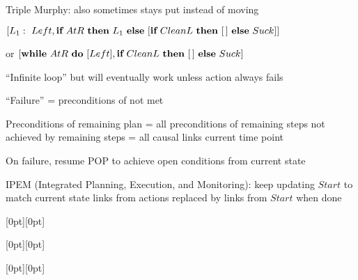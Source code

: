 \documentclass{article}
\newcommand{\condstep}[3]{\mbf{if}~#1~\mbf{then}~#2~\mbf{else}~#3}
\newcommand{\whilestep}[2]{\mbf{while}~#1~\mbf{do}~#2}
\newcommand{\noplan}{\emptylist}
\begin{document}
\begin{huge}
Triple Murphy: also sometimes stays put instead of moving

\vspace*{0.2in}

\textwidth
{}

$[L_1:\ Left, \condstep{AtR}{L_1}{[\condstep{CleanL}{\noplan}{Suck}]}]$

or $[\whilestep{AtR}{[Left]}, \condstep{CleanL}{\noplan}{Suck}]$

``Infinite loop'' but will eventually work unless action always fails


``Failure'' = preconditions of  not met

Preconditions of remaining plan\nl
= all preconditions of remaining steps not achieved by remaining steps\nl
= all causal links  current time point

On failure, resume POP to achieve open conditions from current state

IPEM (Integrated Planning, Execution, and Monitoring):\nl
  keep updating $Start$ to match current state\nl
  links from actions replaced by links from $Start$ when done


\vspace*{0.2in}

\centerline{\raisebox{-0.9\textheight}[0pt][0pt]{\textheight{}}}



\vspace*{0.2in}

\centerline{\raisebox{-0.9\textheight}[0pt][0pt]{\textheight{}}}



\vspace*{0.2in}

\centerline{\raisebox{-0.9\textheight}[0pt][0pt]{\textheight{}}}




\end{huge}
\end{document}
